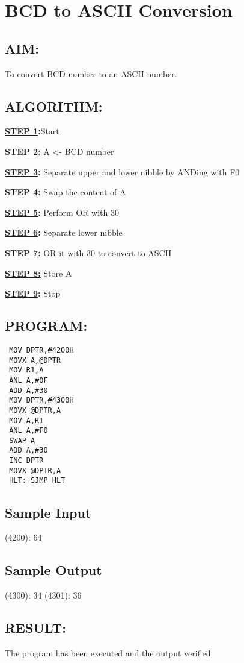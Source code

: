 \chapter{ BCD to ASCII Conversion}
%
%
%
%
\section*{AIM:}
To convert BCD number to an ASCII number.

\section*{ALGORITHM:}
\textbf{\underline{STEP 1}:}Start

\textbf{\underline{STEP 2}:} A <- BCD number

\textbf{\underline{STEP 3}:} Separate upper and lower nibble by ANDing with F0

\textbf{\underline{STEP 4}:} Swap the content of A

\textbf{\underline{STEP 5}:} Perform OR with 30 

\textbf{\underline{STEP 6}:} Separate lower nibble

\textbf{\underline{STEP 7}:} OR it with 30 to convert to ASCII

\textbf{\underline{STEP 8:}} Store A

\textbf{\underline{STEP 9}:} Stop


\section*{PROGRAM:}

\begin{lstlisting}
 MOV DPTR,#4200H
 MOVX A,@DPTR
 MOV R1,A 
 ANL A,#0F 
 ADD A,#30
 MOV DPTR,#4300H
 MOVX @DPTR,A 
 MOV A,R1
 ANL A,#F0
 SWAP A
 ADD A,#30
 INC DPTR
 MOVX @DPTR,A
 HLT: SJMP HLT
\end{lstlisting}

\section*{Sample Input}
(4200): 64
\section*{Sample Output}
(4300): 34 
(4301): 36 

\section*{RESULT:}
The program has been executed and the output verified
%
%
%
%
